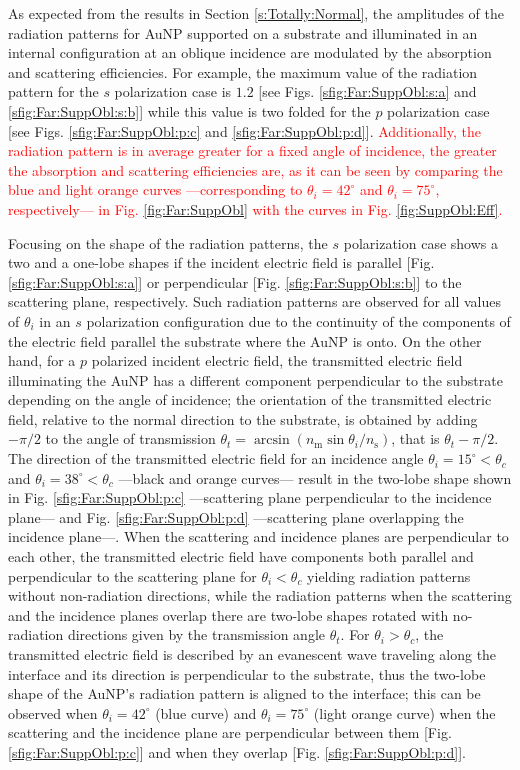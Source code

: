 As expected from the results in Section \ref{s:Totally:Normal}, the amplitudes of the radiation patterns for AuNP supported on a substrate and illuminated in an internal configuration at an oblique incidence are modulated by the absorption and scattering efficiencies. For example, the maximum value of the radiation pattern for the $s$ polarization case is $1.2$ [see Figs. \ref{sfig:Far:SuppObl:s:a} and \ref{sfig:Far:SuppObl:s:b}] while this value is two folded for the $p$ polarization case [see Figs. \ref{sfig:Far:SuppObl:p:c} and \ref{sfig:Far:SuppObl:p:d}]. \textcolor{red}{Additionally, the radiation pattern is in average greater for a fixed angle of incidence, the greater the absorption and scattering efficiencies are, as it can be seen by comparing the blue and light orange curves ---corresponding to $\theta_i = 42^\circ$ and $\theta_i = 75^\circ$, respectively--- in Fig. \ref{fig:Far:SuppObl} with the curves in Fig. \ref{fig:SuppObl:Eff}.}

Focusing on the shape of the radiation patterns, the $s$ polarization case shows a two and a one-lobe shapes if the incident electric field is parallel [Fig. \ref{sfig:Far:SuppObl:s:a}] or perpendicular [Fig. \ref{sfig:Far:SuppObl:s:b}] to the scattering plane, respectively. Such radiation patterns are observed for all values of $\theta_i$ in an $s$ polarization configuration due to the continuity of the components of the electric field parallel the substrate where the AuNP is onto. On the other hand, for a $p$ polarized incident electric field, the transmitted electric field illuminating the AuNP has a different component perpendicular to the substrate depending on the angle of incidence; the orientation of the transmitted electric field, relative to the normal direction to the substrate, is obtained by adding $-\pi/2$ to the angle of transmission $\theta_t = \arcsin(n_\text{m}\sin\theta_i/n_\text{s})$, that is $\theta_t - \pi/2$. The direction of the transmitted electric field for an incidence angle $\theta_i = 15^\circ<\theta_c$ and $\theta_i = 38^\circ<\theta_c$ ---black and orange curves--- result in the two-lobe shape shown in Fig. \ref{sfig:Far:SuppObl:p:c} ---scattering plane perpendicular to the incidence plane--- and Fig. \ref{sfig:Far:SuppObl:p:d} ---scattering plane overlapping the incidence plane---. When the scattering and incidence planes are perpendicular to each other, the transmitted electric field have components both parallel and perpendicular to the scattering plane for $\theta_i<\theta_c$ yielding radiation patterns without non-radiation directions, while the radiation patterns when the scattering and the incidence planes overlap there are two-lobe shapes rotated with no-radiation directions given by the transmission angle $\theta_t$. For $\theta_i>\theta_c$, the transmitted electric field is described by an evanescent wave traveling along the interface and its direction is perpendicular to the substrate, thus the two-lobe shape of the AuNP's radiation pattern is aligned to the interface; this can be observed when $\theta_i = 42^\circ$ (blue curve) and $\theta_i = 75^\circ$ (light orange curve) when the scattering and the incidence plane are perpendicular between them [Fig. \ref{sfig:Far:SuppObl:p:c}] and when they overlap [Fig. \ref{sfig:Far:SuppObl:p:d}].

